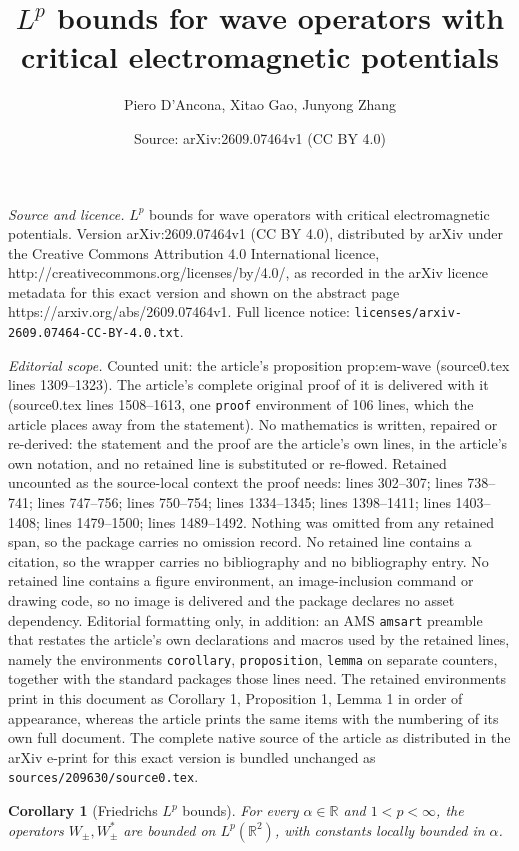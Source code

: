 \documentclass[10pt,a4paper]{amsart}
\title{$L^p$ bounds for wave operators with critical electromagnetic potentials}
\author{Piero D'Ancona, Xitao Gao, Junyong Zhang}
\date{Source: arXiv:2609.07464v1 (CC BY 4.0)}
\newtheorem{corollary}{Corollary}
\newcommand{\R}{\mathbb R}
\begin{document}
\maketitle

\noindent\emph{Source and licence.} $L^p$ bounds for wave operators with critical electromagnetic potentials. Version arXiv:2609.07464v1 (CC BY 4.0), distributed by arXiv under the Creative Commons Attribution 4.0 International licence, http://creativecommons.org/licenses/by/4.0/, as recorded in the arXiv licence metadata for this exact version and shown on the abstract page https://arxiv.org/abs/2609.07464v1. Full licence notice: \texttt{licenses/arxiv-2609.07464-CC-BY-4.0.txt}.\par\smallskip

\noindent\textit{Editorial scope.} Counted unit: the article's proposition prop:em-wave (source0.tex lines 1309--1323). The article's complete original proof of it is delivered with it (source0.tex lines 1508--1613, one \texttt{proof} environment of 106 lines, which the article places away from the statement). No mathematics is written, repaired or re-derived: the statement and the proof are the article's own lines, in the article's own notation, and no retained line is substituted or re-flowed.  Retained uncounted as the source-local context the proof needs: lines 302--307; lines 738--741; lines 747--756; lines 750--754; lines 1334--1345; lines 1398--1411; lines 1403--1408; lines 1479--1500; lines 1489--1492.  Nothing was omitted from any retained span, so the package carries no omission record.  No retained line contains a citation, so the wrapper carries no bibliography and no bibliography entry.  No retained line contains a figure environment, an image-inclusion command or drawing code, so no image is delivered and the package declares no asset dependency.  Editorial formatting only, in addition: an AMS \texttt{amsart} preamble that restates the article's own declarations and macros used by the retained lines, namely the environments \texttt{corollary}, \texttt{proposition}, \texttt{lemma} on separate counters, together with the standard packages those lines need.  The retained environments print in this document as Corollary 1, Proposition 1, Lemma 1 in order of appearance, whereas the article prints the same items with the numbering of its own full document.  The complete native source of the article as distributed in the arXiv e-print for this exact version is bundled unchanged as \texttt{sources/209630/source0.tex}.
\begin{corollary}[Friedrichs $L^{p}$ bounds]
\label{cor:AB-unweighted}
  For every $\alpha\in\R$ and $1<p<\infty$, the operators
  $W_\pm,W_\pm^*$ are bounded on $L^p(\R^2)$, with constants
  locally bounded in $\alpha$. 
\end{corollary}
\end{document}
